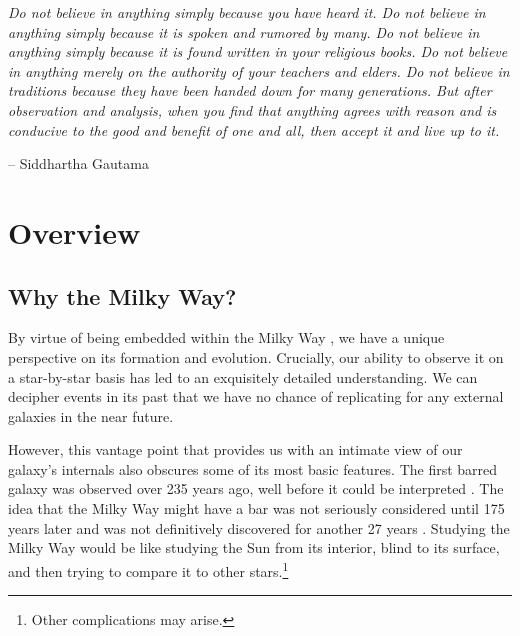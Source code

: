 

\begin{adjustwidth}{.8cm}{0cm}
\textit{Do not believe in anything simply because you have heard it. Do not believe in anything simply because it is spoken and rumored by many. Do not believe in anything simply because it is found written in your religious books. Do not believe in anything merely on the authority of your teachers and elders. Do not believe in traditions because they have been handed down for many generations. But after observation and analysis, when you find that anything agrees with reason and is conducive to the good and benefit of one and all, then accept it and live up to it.}

\hspace{9cm} -- Siddhartha Gautama
\end{adjustwidth}

\section{Overview}
\label{sec:overview_MW}

\subsection{Why the Milky Way?}
By virtue of being embedded within the Milky Way \citep{1610snml.book.....G}, we have a unique perspective on its formation and evolution. Crucially, our ability to observe it on a star-by-star basis has led to an exquisitely detailed understanding. We can decipher events in its past that we have no chance of replicating for any external galaxies in the near future. 

However, this vantage point that provides us with an intimate view of our galaxy's internals also obscures some of its most basic features. The first barred galaxy was observed over 235 years ago, well before it could be interpreted \citep{1789RSPT...79..212H}. The idea that the Milky Way might have a bar was not seriously considered until 175 years later \citep{1964IAUS...20..195D} and was not definitively discovered for another 27 years \citep{1991ApJ...379..631B}. Studying the Milky Way would be like studying the Sun from its interior, blind to its surface, and then trying to compare it to other stars.\footnote{Other complications may arise.}

